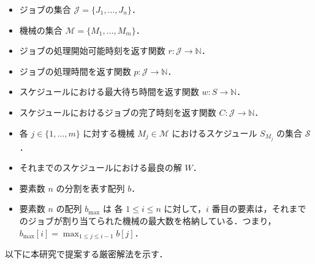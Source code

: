 \documentclass[12pt]{optlab-bachelor}
\begin{document}
\begin{itemize}
  \item ジョブの集合 $\mathcal{J} = \{J_1,\ldots,J_n\}$．
  \item 機械の集合 $\mathcal{M} = \{M_1,\ldots,M_m\}$．
  \item ジョブの処理開始可能時刻を返す関数 $r : \mathcal{J} \to \mathbb{N}$．
  \item ジョブの処理時間を返す関数 $p : \mathcal{J} \to \mathbb{N}$．
  \item スケジュールにおける最大待ち時間を返す関数 $w : S \to \mathbb{N}$．
  \item スケジュールにおけるジョブの完了時刻を返す関数 $C : \mathcal{J} \to \mathbb{N}$．
  \item 各 $j \in \{1,\ldots,m\}$ に対する機械 $M_j \in \mathcal{M}$ におけるスケジュール $S_{M_j}$ の集合 $\mathcal{S}$．
  \item それまでのスケジュールにおける最良の解 $W$．
  \item 要素数 $n$ の分割を表す配列 $b$．
  \item 要素数 $n$ の配列 $b_{\max}$ は 各 $1 \le i \le n$ に対して，$i$ 番目の要素は，それまでのジョブが割り当てられた機械の最大数を格納している．つまり，$b_{\max}[i] = \displaystyle \max_{1\le j \le i - 1}b[j]$．
\end{itemize}

以下に本研究で提案する厳密解法を示す．
\end{document}

